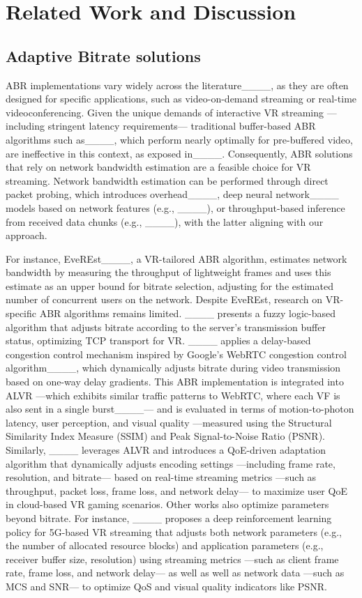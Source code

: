 \section{Related Work and Discussion}
\subsection{Adaptive Bitrate solutions}

ABR implementations vary widely across the literature____, as they are often designed for specific applications, such as video-on-demand streaming or real-time videoconferencing. Given the unique demands of interactive VR streaming ---including stringent latency requirements--- traditional buffer-based ABR algorithms such as____, which perform nearly optimally for pre-buffered video, are ineffective in this context, as exposed in____. Consequently, ABR solutions that rely on network bandwidth estimation are a feasible choice for VR streaming. Network bandwidth estimation can be performed through direct packet probing, which introduces overhead____, deep neural network____ models based on network features (e.g., ____), or throughput-based inference from received data chunks (e.g., ____), with the latter aligning with our approach.

For instance, EveREst____, a VR-tailored ABR algorithm, estimates network bandwidth by measuring the throughput of lightweight frames and uses this estimate as an upper bound for bitrate selection, adjusting for the estimated number of concurrent users on the network. Despite EveREst, research on VR-specific ABR algorithms remains limited. ____ presents a fuzzy logic-based algorithm that adjusts bitrate according to the server’s transmission buffer status, optimizing TCP transport for VR. ____ applies a delay-based congestion control mechanism inspired by Google's WebRTC congestion control algorithm____, which dynamically adjusts bitrate during video transmission based on one-way delay gradients. This ABR implementation is integrated into ALVR ---which exhibits similar traffic patterns to WebRTC, where each VF is also sent in a single burst____--- and is evaluated in terms of motion-to-photon latency, user perception, and visual quality ---measured using the Structural Similarity Index Measure (SSIM) and Peak Signal-to-Noise Ratio (PSNR). Similarly, ____ leverages ALVR and introduces a QoE-driven adaptation algorithm that dynamically adjusts encoding settings ---including frame rate, resolution, and bitrate--- based on real-time streaming metrics ---such as throughput, packet loss, frame loss, and network delay--- to maximize user QoE in cloud-based VR gaming scenarios.
Other works also optimize parameters beyond bitrate. For instance, ____ proposes a deep reinforcement learning policy for 5G-based VR streaming that adjusts both network parameters (e.g., the number of allocated resource blocks) and application parameters (e.g., receiver buffer size, resolution) using streaming metrics ---such as client frame rate, frame loss, and network delay--- as well as well as network data ---such as MCS and SNR--- to optimize QoS and visual quality indicators like PSNR.

